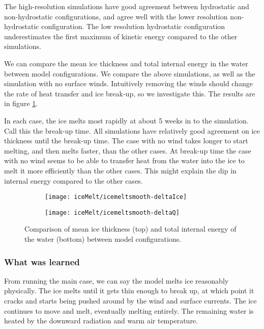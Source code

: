 \documentclass[11pt]{article}
\begin{document}
The high-resolution simulations have good agreement between hydrostatic and non-hydrostatic configurations, and agree well with the lower resolution non-hydrostatic configuration. The low resolution hydrostatic configuration underestimates the first maximum of kinetic energy compared to the other simulations.

We can compare the mean ice thickness and total internal energy in the water between model configurations. We compare the above simulations, as well as the simulation with no surface winds. Intuitively removing the winds should change the rate of heat transfer and ice break-up, so we investigate this. The results are in figure \ref{fig:iceMeltCompareWinds}.

In each case, the ice melts most rapidly at about 5 weeks in to the simulation. Call this the break-up time. All simulations have relatively good agreement on ice thickness until the break-up time. The case with no wind takes longer to start melting, and then melts faster, than the other cases. At break-up time the case with no wind seems to be able to transfer heat from the water into the ice to melt it more efficiently than the other cases. This might explain the dip in internal energy compared to the other cases.

\clearpage
\begin{figure}[h!]
\begin{subfigure}{0.95\linewidth}
\centering
\texttt{[image: iceMelt/icemeltsmooth-deltaIce]}
\end{subfigure}
\begin{subfigure}{0.95\linewidth}
\texttt{[image: iceMelt/icemeltsmooth-deltaQ]}
\end{subfigure}
\caption{Comparison of mean ice thickness (top) and total internal energy of the water (bottom) between model configurations.}
\label{fig:iceMeltCompareWinds}
\end{figure}

\subsubsection{What was learned}
From running the main case, we can say the model melts ice reasonably physically. The ice melts until it gets thin enough to break up, at which point it cracks and starts being pushed around by the wind and surface currents. The ice continues to move and melt, eventually melting entirely. The remaining water is heated by the downward radiation and warm air temperature.
\end{document}
